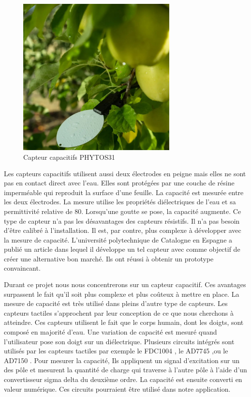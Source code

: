 \begin{figure}[!ht]
\centering
\includegraphics[width=8cm]{leaf-wetness-3}
\caption{Capteur capacitifs PHYTOS31 \cite{evvos}}
\end{figure}

\newpage
Les capteurs capacitifs utilisent aussi deux électrodes en peigne mais elles ne sont pas en contact direct avec l'eau. Elles sont protégées par une couche de résine imperméable qui reproduit la surface d'une feuille. La  capacité est mesurée entre les deux électrodes. La mesure utilise les propriétés diélectriques de l'eau et sa permittivité relative de 80. Lorsqu'une goutte se pose, la capacité augmente. Ce type de capteur n'a pas les désavantages des capteurs résistifs. Il n'a pas besoin d'être calibré à l'installation. Il est, par contre, plus complexe à développer avec la mesure de capacité. L'université polytechnique de Catalogne en Espagne a publié un article\cite{HORNERO2017286} dans lequel il développe un tel capteur avec comme objectif de créer une alternative bon marché. Ils ont réussi à obtenir un prototype convaincant.

Durant ce projet nous nous concentrerons sur un capteur capacitif. Ces avantages surpassent le fait qu'il soit plus complexe et plus coûteux à mettre en place. La mesure de capacité est très utilisé dans pleins d'autre type de capteurs. Les capteurs tactiles s’approchent par leur conception de ce que nous cherchons à atteindre. Ces capteurs utilisent le fait que le corps humain, dont les doigts, sont composé en majorité d'eau. Une variation de capacité est mesuré quand l'utilisateur pose son doigt sur un diélectrique. Plusieurs circuits intégrés sont utilisés par les capteurs tactiles par exemple le FDC1004 \cite{fdc1004}, le AD7745 \cite{ad7745},ou le AD7150 \cite{ad7150}. Pour mesurer la capacité, Ils appliquent un signal d'excitation sur un des pôle et mesurent la quantité de charge qui traverse à l'autre pôle à l'aide d'un convertisseur sigma delta du deuxième ordre. La capacité est ensuite converti en valeur numérique. Ces circuits pourraient être utilisé dans notre application.
